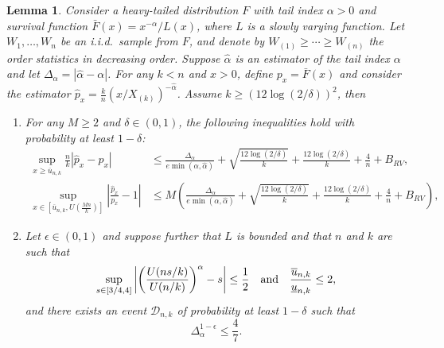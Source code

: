 \documentclass{article}
\numberwithin{equation}{section}
\newtheorem{lemma}{Lemma}[section]
\begin{document}
\begin{lemma}\label{lem:relative_deviation_evt_estimator} 
    Consider a heavy-tailed distribution \(F\) with tail index
    \(\alpha > 0\) and survival function \(\bar{F}(x) = x^{-\alpha}
    / L(x)\), where \(L\) is a slowly varying function. Let \(W_1,
    \ldots, W_n\) be an i.i.d.\ sample from \(F\), and denote by
    \(W_{(1)} \geq \cdots \geq W_{(n)}\) the order statistics in
    decreasing order. Suppose \(\widehat{\alpha}\) is an estimator
    of the tail index \(\alpha\) and let
    \(\Delta_{\alpha}=|\widehat{\alpha}-\alpha|\). For any \(k <
    n\) and \(x > 0\),
    define \(p_x = \bar{F}(x)\) and consider the estimator
    \(\widehat{p}_{x} = \frac{k}{n}
    \left(x/X_{(k)}\right)^{-\widehat \alpha}\).
    Assume \(k\geq (12\log(2/\delta))^2\), then

    \begin{enumerate}[label= (\roman*)]
        \item For any \(M\geq 2\) and \(\delta\in(0,1)\), the
            following inequalities hold
            with probability at least  \(1-\delta\):
            \begin{align}
                \sup_{x\geq \overline{u}_{n,k}}
                \frac{n}{k}\left|\widehat{p}_{x}-p_x\right| & \leq
                \frac{\Delta_{\alpha}}{e \min{(\alpha,
                \hat{\alpha})}} + \sqrt{\frac{12\log(2/\delta)}{k}} +
                \frac{12\log(2/\delta)}{k} + \frac{4}{n} +
                B_{RV},\label{eq:control_absolute_deviation}    \\
                \sup_{x\in \left[\overline{u}_{n,k},
                U(\frac{Mn}{k})\right]}
                \left|\frac{\widehat{p}_{x}}{p_x}-1\right|  & \leq M
                \left(\frac{\Delta_{\alpha}}{e \min{(\alpha,
                    \hat{\alpha})}} +
                    \sqrt{\frac{12\log(2/\delta)}{k}} +
                    \frac{12\log(2/\delta)}{k} + \frac{4}{n} +
                B_{RV}\right),\label{eq:control_relative_deviation_on_compacts}
            \end{align}

        \item Let \(\epsilon\in(0,1)\) and suppose further that \(L\)
            is bounded 
            and that \(n\)
            and \(k\) are such that
            \begin{equation}\label{eq:uniform_boundness_slowly_varying}
                \sup_{s\in[3/4,4]}{\left|\left(\frac{U(ns/k)}{U(n/k)}\right)^{\alpha}-s\right|}\leq
                \frac{1}{2}\quad\textnormal{and}\quad
                \frac{\overline u_{n,k}}{\underline u_{n,k}}  \le 2,
            \end{equation}
            and there exists an event \(\mathcal{D}_{n,k}\) of
            probability at least  \(1-\delta\)
            such that
            \begin{equation}\label{eq:control_absolute_deviation_alpha_estimator}
                \Delta_{\alpha}^{1-\epsilon}\leq \frac{4}{7}.
            \end{equation}


\end{enumerate}
\end{lemma}
\end{document}
